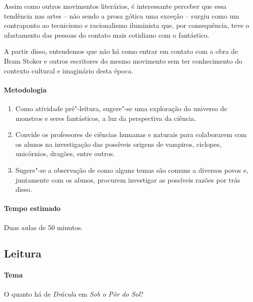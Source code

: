 \documentclass[12pt]{extarticle}
\begin{document}
Assim como outros movimentos literários, é interessante perceber que essa tendência nas artes -- não 
sendo a prosa gótica uma exceção -- surgiu como um contraponto ao tecnicismo e racionalismo iluminista 
que, por consequência, teve o afastamento das pessoas do contato mais cotidiano com o fantástico. 

A partir disso, entendemos que não há como entrar em contato com a obra de Bram Stoker e outros escritores 
do mesmo movimento sem ter conhecimento do contexto cultural e imaginário desta época.

\paragraph{Metodologia}

\begin{enumerate}
\item
Como atividade pré"-leitura, sugere"-se uma exploração do universo de
monstros e seres fantásticos, a luz da perspectiva da ciência. 

\item
Convide os professores de ciências humanas e naturais para colaborarem com os
alunos na investigação das possíveis origens de vampiros, ciclopes,
unicórnios, dragões, entre outros. 

\item
Sugere"-se a observação de como alguns
temas são comuns a diversos povos e, juntamente com os alunos, procurem
investigar as possíveis razões por trás disso.

\end{enumerate}

\paragraph{Tempo estimado} Duas aulas de 50 minutos.


\subsection{Leitura} 

\paragraph{Tema} O quanto há de \emph{Drácula} em \emph{Sob o Pôr do Sol}?
\end{document}
